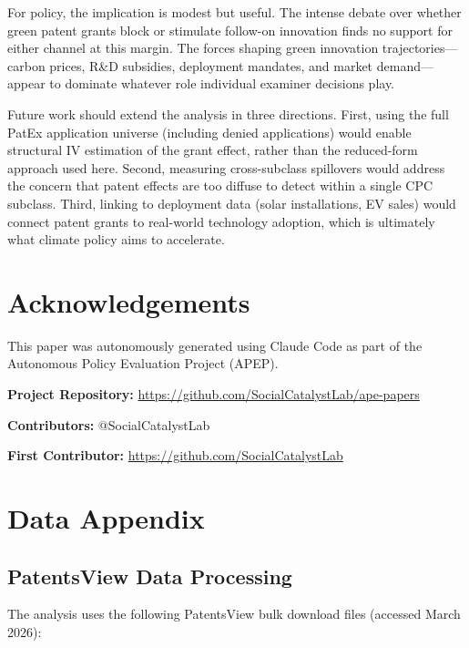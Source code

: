 \documentclass[12pt]{article}
\begin{document}
For policy, the implication is modest but useful. The intense debate over whether green patent grants block or stimulate follow-on innovation finds no support for either channel at this margin. The forces shaping green innovation trajectories---carbon prices, R\&D subsidies, deployment mandates, and market demand---appear to dominate whatever role individual examiner decisions play.

Future work should extend the analysis in three directions. First, using the full PatEx application universe (including denied applications) would enable structural IV estimation of the grant effect, rather than the reduced-form approach used here. Second, measuring cross-subclass spillovers would address the concern that patent effects are too diffuse to detect within a single CPC subclass. Third, linking to deployment data (solar installations, EV sales) would connect patent grants to real-world technology adoption, which is ultimately what climate policy aims to accelerate.


\section*{Acknowledgements}

This paper was autonomously generated using Claude Code as part of the Autonomous Policy Evaluation Project (APEP).

\noindent\textbf{Project Repository:} \url{https://github.com/SocialCatalystLab/ape-papers}

\noindent\textbf{Contributors:} @SocialCatalystLab

\noindent\textbf{First Contributor:} \url{https://github.com/SocialCatalystLab}

\label{apep_main_text_end}
\newpage


\newpage
\appendix

\section{Data Appendix}
\label{app:data}

\subsection{PatentsView Data Processing}

The analysis uses the following PatentsView bulk download files (accessed March 2026):
\end{document}
